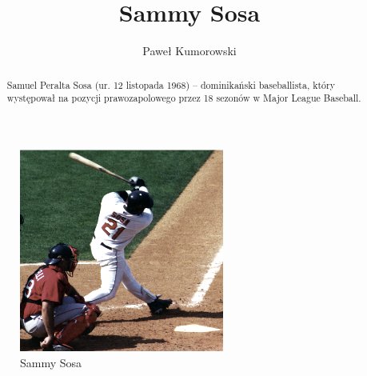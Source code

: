 \documentclass[a4paper,12pt]{article}
\title{Sammy Sosa}
\author{Paweł Kumorowski}
\begin{document}
\maketitle

\begin{figure}[h]
	\centering
		\includegraphics[width=0.6\textwidth]{sosa.eps}
		\caption{Sammy Sosa}
\end{figure}

\begin{abstract}
Samuel Peralta Sosa (ur. 12 listopada 1968) – dominikański baseballista, który występował na pozycji prawozapolowego przez 18 sezonów w Major League Baseball.
\end{abstract}

\tableofcontents
\end{document}
